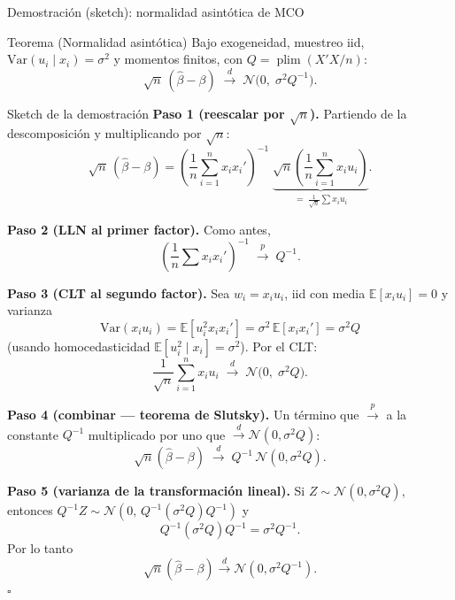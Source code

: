 \documentclass{beamer}
\DeclareMathOperator*{\plim}{plim}
\begin{document}
\begin{frame}[allowframebreaks]{Demostración (sketch): normalidad asintótica de MCO}

\begin{alertblock}{Teorema (Normalidad asintótica)}
Bajo exogeneidad, muestreo iid, $\text{Var}(u_i\mid x_i)=\sigma^2$ y momentos finitos, con $Q=\plim(X'X/n)$:
\[
\sqrt{n}\,(\hat{\beta}-\beta) \;\overset{d}{\to}\; \mathcal{N}\!\big(0,\;\sigma^2 Q^{-1}\big).
\]
\end{alertblock}

\begin{exampleblock}{Sketch de la demostración}
\textbf{Paso 1 (reescalar por $\sqrt{n}$).} Partiendo de la descomposición y multiplicando por $\sqrt{n}$:
\[
\sqrt{n}\,(\hat{\beta}-\beta) = \left(\frac{1}{n}\sum_{i=1}^n x_i x_i'\right)^{-1}\;\underbrace{\sqrt{n}\left(\frac{1}{n}\sum_{i=1}^n x_i u_i\right)}_{=\;\frac{1}{\sqrt{n}}\sum x_i u_i}.
\]

\textbf{Paso 2 (LLN al primer factor).} Como antes,
\[
\left(\frac{1}{n}\sum x_i x_i'\right)^{-1} \;\overset{p}{\to}\; Q^{-1}.
\]

\framebreak

\textbf{Paso 3 (CLT al segundo factor).} Sea $w_i = x_i u_i$, iid con media $\mathbb{E}[x_i u_i]=0$ y varianza
\[
\text{Var}(x_i u_i) = \mathbb{E}[u_i^2 x_i x_i'] = \sigma^2\,\mathbb{E}[x_i x_i'] = \sigma^2 Q
\]
(usando homocedasticidad $\mathbb{E}[u_i^2\mid x_i]=\sigma^2$). Por el CLT:
\[
\frac{1}{\sqrt{n}}\sum_{i=1}^n x_i u_i \;\overset{d}{\to}\; \mathcal{N}\big(0,\;\sigma^2 Q\big).
\]

\textbf{Paso 4 (combinar — teorema de Slutsky).} Un término que $\overset{p}{\to}$ a la constante $Q^{-1}$ multiplicado por uno que $\overset{d}{\to}\mathcal{N}(0,\sigma^2 Q)$:
\[
\sqrt{n}(\hat{\beta}-\beta) \;\overset{d}{\to}\; Q^{-1}\,\mathcal{N}(0,\sigma^2 Q).
\]

\textbf{Paso 5 (varianza de la transformación lineal).} Si $Z\sim\mathcal{N}(0,\sigma^2 Q)$, entonces $Q^{-1}Z\sim\mathcal{N}(0,\,Q^{-1}(\sigma^2 Q)Q^{-1})$ y
\[
Q^{-1}(\sigma^2 Q)Q^{-1} = \sigma^2 Q^{-1}.
\]
Por lo tanto
\[
\boxed{\;\sqrt{n}(\hat{\beta}-\beta) \overset{d}{\to} \mathcal{N}(0,\sigma^2 Q^{-1}).\;}
\]
\hfill $\square$
\end{exampleblock}

\end{frame}
\end{document}
